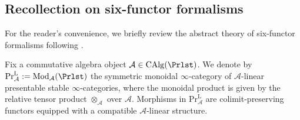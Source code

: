 \subsection{Recollection on six-functor formalisms}
For the reader's convenience, we briefly review the abstract theory of six-functor formalisms following \cite{Liu_Zheng2012, Mann2022, Scholze2025, Cnossen_Lenz_Linskens2026}.

Fix a commutative algebra object $\mathcal A \in \operatorname{CAlg}(\Prlst)$. We denote by $\mathrm{Pr}^{\mathrm{L}}_{\mathcal A} := \operatorname{Mod}_{\mathcal A}(\Prlst)$ the symmetric monoidal $\infty$-category of $\mathcal A$-linear presentable stable $\infty$-categories, where the monoidal product is given by the relative tensor product $\otimes_{\mathcal A}$ over $\mathcal A$. Morphisms in $\mathrm{Pr}^{\mathrm{L}}_{\mathcal A}$ are colimit-preserving functors equipped with a compatible $\mathcal A$-linear structure. 

